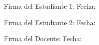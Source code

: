\documentclass[12pt,twoside,letterpaper]{article}
\begin{document}
\begin{flushleft}

Firma del Estudiante 1:
\hrulefill \hspace{1 cm} Fecha: \hrulefill \\

\vspace{1 cm}

Firma del Estudiante 2: \hrulefill \hspace{1 cm} Fecha: \hrulefill\\

\vspace{1 cm}

Firma del Docente: \hrulefill \hspace{1 cm} \vspace{1 cm}    Fecha: \hrulefill\\

\end{flushleft}


\renewcommand{\refname}{Referencias} %


\end{document}

